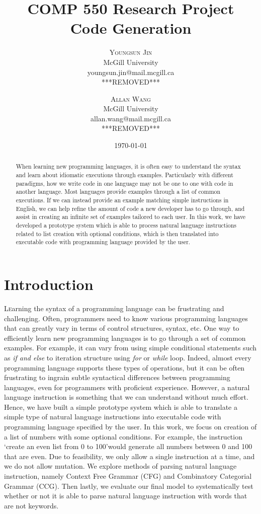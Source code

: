 \documentclass[twoside,twocolumn]{article}
\title{%
	\huge COMP 550 Research Project \\
	\large Code Generation}
\author{%
\textsc{Youngsun Jin} \\
\normalsize McGill University \\ 
\normalsize youngsun.jin@mail.mcgill.ca \\
\normalsize {***REMOVED***} 
\and 
\textsc{Allan Wang} \\
\normalsize McGill University \\ 
\normalsize allan.wang@mail.mcgill.ca \\
\normalsize {***REMOVED***} 
}
\date{\today} %
\begin{document}
\maketitle


\begin{abstract}
When learning new programming languages, it is often easy to understand the syntax and learn
about idiomatic executions through examples. Particularly with different paradigms, how we
write code in one language may not be one to one with code in another language. Most
languages provide examples through a list of common executions. If we can instead provide an
example matching simple instructions in English, we can help refine the amount of code
a new developer has to go through, and assist in creating an infinite set of examples tailored to
each user. In this work, we have developed a prototype system which is able to process natural language instructions
related to list creation with optional conditions, which is then translated into executable code with programming language provided by the user.  
\end{abstract}
\section{Introduction}

\lettrine[nindent=0em,lines=2]{L}earning the syntax of a programming language can be frustrating and challenging. Often, programmers need to
know various programming languages that can greatly vary in terms of control structures, syntax, etc. One way to efficiently learn new
programming languages is to go through a set of common examples. For example, it can vary from using simple conditional statements such as  \textit{if and else} to iteration structure using \textit{for} or \textit{while} loop. Indeed, almost every programming language supports these types of operations, but it can be often frustrating to ingrain subtle syntactical differences between programming languages, even for programmers with proficient experience. However, a natural language instruction is something that we can understand without much effort. Hence, we have built a simple prototype system which is able to translate a simple type of natural language instructions into executable code with programming language specified by the user. In this work, we focus on creation of a list of numbers with some optional conditions. For example, the instruction \lq create an even list from 0 to 100\rq \enspace would generate all numbers between 0 and 100 that are even. Due to feasibility, we only allow a single instruction at a time, and we do not allow mutation. We explore methods of parsing natural language instruction, namely Context Free Grammar (CFG) and Combinatory Categorial Grammar (CCG). Then lastly, we evaluate our final model to systematically test whether or not it is able to parse natural language instruction with words that are not keywords.     
\end{document}
